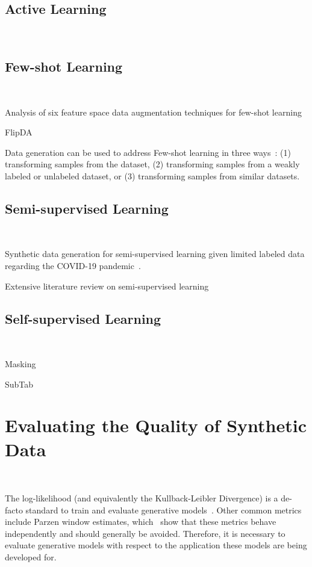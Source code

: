 \documentclass[parskip=full]{scrartcl}
\begin{document}
\subsection{Active Learning}~\label{sec:active-learning}

\subsection{Few-shot Learning}~\label{sec:few-shot-learning}

Analysis of six feature space data augmentation techniques for few-shot
learning~\cite{kumar2019closer}

FlipDA~\cite{zhou2021flipda}

Data generation can be used to address Few-shot learning in three
ways~\cite{wang2020generalizing}: (1) transforming samples from the dataset,
(2) transforming samples from a weakly labeled or unlabeled dataset, or (3)
transforming samples from similar datasets.

\subsection{Semi-supervised Learning}~\label{sec:semi-supervised-learning}

Synthetic data generation for semi-supervised learning given limited labeled
data regarding the COVID-19 pandemic~\cite{das2022conditional}.

Extensive literature review on semi-supervised learning~\cite{van2020survey}

\subsection{Self-supervised Learning}~\label{sec:self-supervised-learning}

Masking~\cite{yoon2020vime}

SubTab~\cite{ucar2021subtab}

\section{Evaluating the Quality of Synthetic Data
}~\label{sec:evaluating-synthetic-data}

The log-likelihood (and equivalently the Kullback-Leibler Divergence) is a
de-facto standard to train and evaluate generative
models~\cite{theis2016note}. Other common metrics include Parzen window
estimates, which~\citet{theis2016note} show that these metrics behave
independently and should generally be avoided. Therefore, it is necessary
to evaluate generative models with respect to the application these models are
being developed for.
\end{document}
